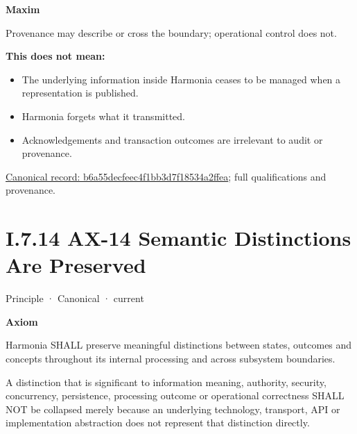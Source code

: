 \par\medskip\textbf{Maxim}\par


Provenance may describe or cross the boundary; operational control does
not.



\textbf{This does not mean:}



\begin{itemize}


\item The underlying information inside Harmonia ceases to be managed when a representation is published.

\item Harmonia forgets what it transmitted.

\item Acknowledgements and transaction outcomes are irrelevant to audit or provenance.

\end{itemize}

{\footnotesize \href{../../../../../../../continuum/motivation/principle/b6a55decfeec4f1bb3d7f18534a2ffea.md}{Canonical record: b6a55decfeec4f1bb3d7f18534a2ffea}; full qualifications and provenance.}\par
\section*{I.7.14 AX-14 Semantic Distinctions Are Preserved}
\label{navigation:I.7.14}

\label{element:d3fc6025dc7646d1b2020b51f7a44bfa}
{\small Principle · Canonical · current}\par

\par\medskip\textbf{Axiom}\par


Harmonia SHALL preserve meaningful distinctions between states, outcomes and concepts throughout its internal processing and across subsystem boundaries.



A distinction that is significant to information meaning, authority, security, concurrency, persistence, processing outcome or operational correctness SHALL NOT be collapsed merely because an underlying technology, transport, API or implementation abstraction does not represent that distinction directly.



